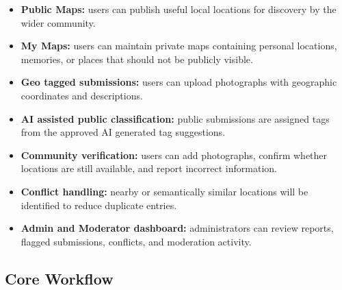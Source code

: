 \documentclass[11pt,a4paper]{article}
\begin{document}
\begin{itemize}[leftmargin=0.7cm]
    \item \textbf{Public Maps:} users can publish useful local locations for
    discovery by the wider community.
    
    \item \textbf{My Maps:} users can maintain private maps containing
    personal locations, memories, or places that should not be publicly
    visible.
    
    \item \textbf{Geo tagged submissions:} users can upload photographs with
    geographic coordinates and descriptions.
    
    \item \textbf{AI assisted public classification:} public submissions are
    assigned tags from the approved AI generated tag suggestions.
    
    \item \textbf{Community verification:} users can add photographs, confirm
    whether locations are still available, and report incorrect information.
    
    \item \textbf{Conflict handling:} nearby or semantically similar
    locations will be identified to reduce duplicate entries.
    
    \item \textbf{Admin and Moderator dashboard:} administrators can review
    reports, flagged submissions, conflicts, and moderation activity.
\end{itemize}

\subsection{Core Workflow}
\end{document}
